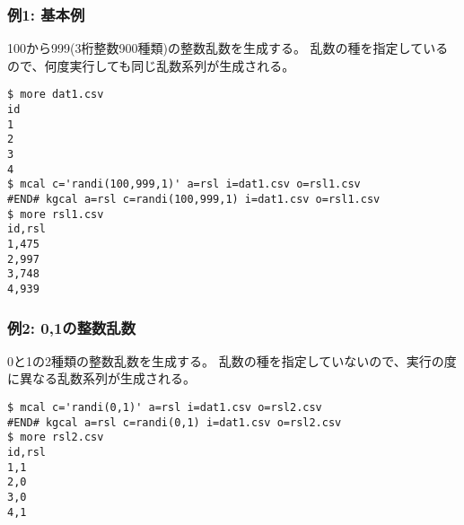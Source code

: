 \subsubsection*{例1: 基本例}

100から999(3桁整数900種類)の整数乱数を生成する。
乱数の種を指定しているので、何度実行しても同じ乱数系列が生成される。


\begin{Verbatim}[baselinestretch=0.7,frame=single]
$ more dat1.csv
id
1
2
3
4
$ mcal c='randi(100,999,1)' a=rsl i=dat1.csv o=rsl1.csv
#END# kgcal a=rsl c=randi(100,999,1) i=dat1.csv o=rsl1.csv
$ more rsl1.csv
id,rsl
1,475
2,997
3,748
4,939
\end{Verbatim}
\subsubsection*{例2: 0,1の整数乱数}

0と1の2種類の整数乱数を生成する。
乱数の種を指定していないので、実行の度に異なる乱数系列が生成される。


\begin{Verbatim}[baselinestretch=0.7,frame=single]
$ mcal c='randi(0,1)' a=rsl i=dat1.csv o=rsl2.csv
#END# kgcal a=rsl c=randi(0,1) i=dat1.csv o=rsl2.csv
$ more rsl2.csv
id,rsl
1,1
2,0
3,0
4,1
\end{Verbatim}
